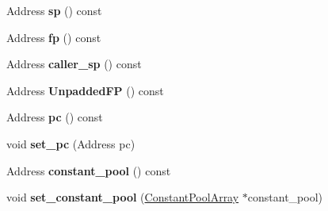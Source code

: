 \begin{DoxyCompactItemize}
\item 
\hypertarget{classv8_1_1internal_1_1_b_a_s_e___e_m_b_e_d_d_e_d_a86a49e3478edf95dec2cb5577666db76}{}Address {\bfseries sp} () const \label{classv8_1_1internal_1_1_b_a_s_e___e_m_b_e_d_d_e_d_a86a49e3478edf95dec2cb5577666db76}

\item 
\hypertarget{classv8_1_1internal_1_1_b_a_s_e___e_m_b_e_d_d_e_d_aebb65c7cef7990d4eff12e5fd8be7251}{}Address {\bfseries fp} () const \label{classv8_1_1internal_1_1_b_a_s_e___e_m_b_e_d_d_e_d_aebb65c7cef7990d4eff12e5fd8be7251}

\item 
\hypertarget{classv8_1_1internal_1_1_b_a_s_e___e_m_b_e_d_d_e_d_a9fba42781815d5b24f05f8175e6b5872}{}Address {\bfseries caller\+\_\+sp} () const \label{classv8_1_1internal_1_1_b_a_s_e___e_m_b_e_d_d_e_d_a9fba42781815d5b24f05f8175e6b5872}

\item 
\hypertarget{classv8_1_1internal_1_1_b_a_s_e___e_m_b_e_d_d_e_d_aa25b1bd3574ba5ed14a0ef801ad4af65}{}Address {\bfseries Unpadded\+F\+P} () const \label{classv8_1_1internal_1_1_b_a_s_e___e_m_b_e_d_d_e_d_aa25b1bd3574ba5ed14a0ef801ad4af65}

\item 
\hypertarget{classv8_1_1internal_1_1_b_a_s_e___e_m_b_e_d_d_e_d_aaf79b626ec2d7ff785ed9fd3df02cb74}{}Address {\bfseries pc} () const \label{classv8_1_1internal_1_1_b_a_s_e___e_m_b_e_d_d_e_d_aaf79b626ec2d7ff785ed9fd3df02cb74}

\item 
\hypertarget{classv8_1_1internal_1_1_b_a_s_e___e_m_b_e_d_d_e_d_ab588af4e3990531069e857c3910b42cc}{}void {\bfseries set\+\_\+pc} (Address pc)\label{classv8_1_1internal_1_1_b_a_s_e___e_m_b_e_d_d_e_d_ab588af4e3990531069e857c3910b42cc}

\item 
\hypertarget{classv8_1_1internal_1_1_b_a_s_e___e_m_b_e_d_d_e_d_af4fc9ca2ff63e7cf684a1981f468903c}{}Address {\bfseries constant\+\_\+pool} () const \label{classv8_1_1internal_1_1_b_a_s_e___e_m_b_e_d_d_e_d_af4fc9ca2ff63e7cf684a1981f468903c}

\item 
\hypertarget{classv8_1_1internal_1_1_b_a_s_e___e_m_b_e_d_d_e_d_a5e72744911819097d641c961c0a0bb46}{}void {\bfseries set\+\_\+constant\+\_\+pool} (\hyperlink{classv8_1_1internal_1_1_constant_pool_array}{Constant\+Pool\+Array} $\ast$constant\+\_\+pool)\label{classv8_1_1internal_1_1_b_a_s_e___e_m_b_e_d_d_e_d_a5e72744911819097d641c961c0a0bb46}


\end{DoxyCompactItemize}
